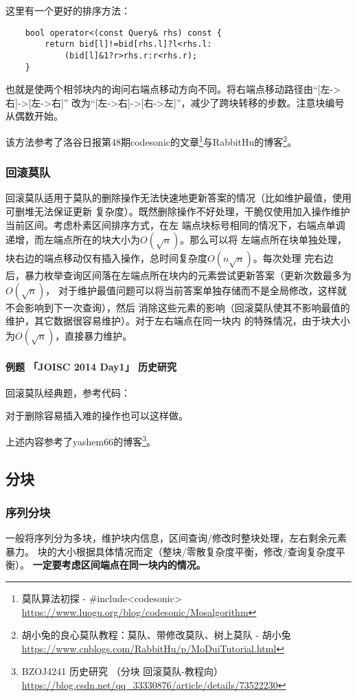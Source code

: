 这里有一个更好的排序方法：
\begin{lstlisting}
    bool operator<(const Query& rhs) const {
        return bid[l]!=bid[rhs.l]?l<rhs.l:
            (bid[l]&1?r>rhs.r:r<rhs.r);
    }
\end{lstlisting}

也就是使两个相邻块内的询问右端点移动方向不同。将右端点移动路径由``[左->右]->[左->右]''
改为``[左->右]->[右->左]''，减少了跨块转移的步数。注意块编号从偶数开始。

该方法参考了洛谷日报第48期codesonic的文章\footnote{
	莫队算法初探 - \#include<codesonic>\\
	\url{https://www.luogu.org/blog/codesonic/Mosalgorithm}
}与RabbitHu的博客\footnote{
	胡小兔的良心莫队教程：莫队、带修改莫队、树上莫队 - 胡小兔
	\url{https://www.cnblogs.com/RabbitHu/p/MoDuiTutorial.html}
}。
\subsubsection{回滚莫队}
回滚莫队适用于莫队的删除操作无法快速地更新答案的情况（比如维护最值，使用可删堆无法保证更新
复杂度）。既然删除操作不好处理，干脆仅使用加入操作维护当前区间。考虑朴素区间排序方式，在左
端点块标号相同的情况下，右端点单调递增，而左端点所在的块大小为$O(\sqrt{n})$。那么可以将
左端点所在块单独处理，块右边的端点移动仅有插入操作，总时间复杂度$O(n\sqrt{n})$。每次处理
完右边后，暴力枚举查询区间落在左端点所在块内的元素尝试更新答案（更新次数最多为$O(\sqrt{n})$，
对于维护最值问题可以将当前答案单独存储而不是全局修改，这样就不会影响到下一次查询），然后
消除这些元素的影响（回滚莫队使其不影响最值的维护，其它数据很容易维护）。对于左右端点在同一块内
的特殊情况，由于块大小为$O(\sqrt{n})$，直接暴力维护。

\paragraph{例题 「JOISC 2014 Day1」 历史研究}
回滚莫队经典题，参考代码：



对于删除容易插入难的操作也可以这样做。

上述内容参考了yashem66的博客\footnote{
	BZOJ4241 历史研究 （分块 回滚莫队-教程向）
	\url{https://blog.csdn.net/qq\_33330876/article/details/73522230}
}。
\subsection{分块}\label{dividing}
\subsubsection{序列分块}
一般将序列分为多块，维护块内信息，区间查询/修改时整块处理，左右剩余元素暴力。
块的大小根据具体情况而定（整块/零散复杂度平衡，修改/查询复杂度平衡）。
{\bfseries 一定要考虑区间端点在同一块内的情况。}

